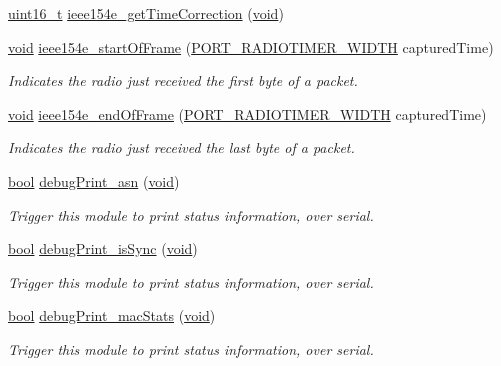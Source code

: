 \begin{DoxyCompactItemize}
\hyperlink{_p_e___types_8h_a1f1825b69244eb3ad2c7165ddc99c956}{uint16\+\_\+t} \hyperlink{group___i_e_e_e802154_e_ga4289cb180ed96aebdfdda0aae1c4ed81}{ieee154e\+\_\+get\+Time\+Correction} (\hyperlink{usb__devapi_8h_afabf60e7f57651d6d595a02c75f07cd0}{void})
\item 
\hyperlink{usb__devapi_8h_afabf60e7f57651d6d595a02c75f07cd0}{void} \hyperlink{group___i_e_e_e802154_e_ga95a880f7fd69afd11fb62abf84512171}{ieee154e\+\_\+start\+Of\+Frame} (\hyperlink{z1_2board__info_8h_ac16e02aadd749b2d27638bed1a805a59}{P\+O\+R\+T\+\_\+\+R\+A\+D\+I\+O\+T\+I\+M\+E\+R\+\_\+\+W\+I\+D\+TH} captured\+Time)
\begin{DoxyCompactList}\small\item\em Indicates the radio just received the first byte of a packet. \end{DoxyCompactList}\item 
\hyperlink{usb__devapi_8h_afabf60e7f57651d6d595a02c75f07cd0}{void} \hyperlink{group___i_e_e_e802154_e_ga883b649614dda6a6e9c55c5e78ed7982}{ieee154e\+\_\+end\+Of\+Frame} (\hyperlink{z1_2board__info_8h_ac16e02aadd749b2d27638bed1a805a59}{P\+O\+R\+T\+\_\+\+R\+A\+D\+I\+O\+T\+I\+M\+E\+R\+\_\+\+W\+I\+D\+TH} captured\+Time)
\begin{DoxyCompactList}\small\item\em Indicates the radio just received the last byte of a packet. \end{DoxyCompactList}\item 
\hyperlink{_p_e___types_8h_a97a80ca1602ebf2303258971a2c938e2}{bool} \hyperlink{group___i_e_e_e802154_e_ga0479350195775e619bb4c9c379804a62}{debug\+Print\+\_\+asn} (\hyperlink{usb__devapi_8h_afabf60e7f57651d6d595a02c75f07cd0}{void})
\begin{DoxyCompactList}\small\item\em Trigger this module to print status information, over serial. \end{DoxyCompactList}\item 
\hyperlink{_p_e___types_8h_a97a80ca1602ebf2303258971a2c938e2}{bool} \hyperlink{group___i_e_e_e802154_e_ga648ec409f5bd3cbce70206f13e3e0c79}{debug\+Print\+\_\+is\+Sync} (\hyperlink{usb__devapi_8h_afabf60e7f57651d6d595a02c75f07cd0}{void})
\begin{DoxyCompactList}\small\item\em Trigger this module to print status information, over serial. \end{DoxyCompactList}\item 
\hyperlink{_p_e___types_8h_a97a80ca1602ebf2303258971a2c938e2}{bool} \hyperlink{group___i_e_e_e802154_e_gacdf572d4f74817a0ed5ab375dfab010a}{debug\+Print\+\_\+mac\+Stats} (\hyperlink{usb__devapi_8h_afabf60e7f57651d6d595a02c75f07cd0}{void})
\begin{DoxyCompactList}\small\item\em Trigger this module to print status information, over serial. \end{DoxyCompactList}\end{DoxyCompactItemize}


